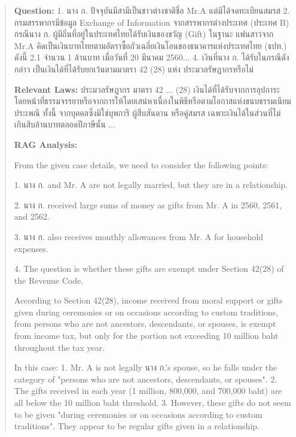 \begin{quote}
    \begin{thai}
    \textbf{Question: } 1. นาง ก. ปัจจุบันมีสามีเป็นชาวต่างชาติชื่อ Mr.A แต่มิได้จดทะเบียนสมรส
  2. กรมสรรพากรมีข้อมูล Exchange of Information จากสรรพากรต่างประเทศ (ประเทศ B) กรณีนาง ก. ผู้มีถิ่นที่อยู่ในประเทศไทยได้รับเงินของขวัญ (Gift) ในฐานะ แฟนสาวจาก Mr.A คิดเป็นเงินบาทไทยตามอัตราซื้อถัวเฉลี่ยเงินโอนของธนาคารแห่งประเทศไทย (ธปท.) ดังนี้
    2.1 จำนวน 1 ล้านบาท เมื่อวันที่ 20 มีนาคม 2560...
  4. เงินที่นาง ก. ได้รับในกรณีดังกล่าว เป็นเงินได้ที่ได้รับยกเว้นตามมาตรา 42 (28) แห่ง ประมวลรัษฎากรหรือไม่

    
    \textbf{Relevant Laws: }
    ประมวลรัษฎากร มาตรา 42
    ...
    (28) เงินได้ที่ได้รับจากการอุปการะโดยหน้าที่ธรรมจรรยาหรือจากการให้โดยเสน่หาเนื่องในพิธีหรือตามโอกาสแห่งขนบธรรมเนียมประเพณี ทั้งนี้ จากบุคคลซึ่งมิใช่บุพการี ผู้สืบสันดาน หรือคู่สมรส เฉพาะเงินได้ในส่วนที่ไม่เกินสิบล้านบาทตลอดปีภาษีนั้น
    ...

    \textbf{RAG Analysis: }

    From the given case details, we need to consider the following points:
    
    1. นาง ก. and Mr. A are not legally married, but they are in a relationship.
    
    2. นาง ก. received large sums of money as gifts from Mr. A in 2560, 2561, and 2562.
    
    3. นาง ก. also receives monthly allowances from Mr. A for household expenses.
    
    4. The question is whether these gifts are exempt under Section 42(28) of the Revenue Code.
    
    According to Section 42(28), income received from moral support or gifts given during ceremonies or on occasions according to custom traditions, from persons who are not ancestors, descendants, or spouses, is exempt from income tax, but only for the portion not exceeding 10 million baht throughout the tax year.
    
    In this case:
    1. Mr. A is not legally นาง ก.'s spouse, so he falls under the category of "persons who are not ancestors, descendants, or spouses".
    2. The gifts received in each year (1 million, 800,000, and 700,000 baht) are all below the 10 million baht threshold.
    3. However, these gifts do not seem to be given "during ceremonies or on occasions according to custom traditions". They appear to be regular gifts given in a relationship.

    \end{thai}
\end{quote}


